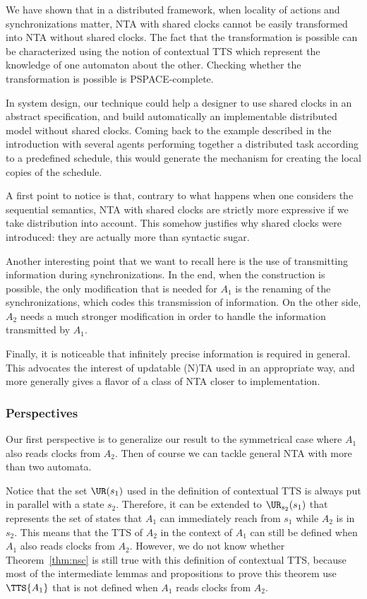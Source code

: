 \documentclass{LMCS}
\theoremstyle{plain}\newtheorem*{prop11}{Proposition~\ref{prop:states} bis}
\begin{document}
We have shown that in a distributed framework, when locality of actions and
synchronizations matter, NTA with shared clocks cannot be easily transformed
into NTA without shared clocks. The fact that the transformation is possible can
be characterized using the notion of contextual TTS which represent the
knowledge of one automaton about the other. Checking whether the transformation
is possible is \textsf{PSPACE}-complete.

In system design, our technique could help a designer to use shared clocks in an
abstract specification, and build automatically an implementable distributed
model without shared clocks.
Coming back to the example described in the introduction with several agents
performing together a distributed task according to a predefined schedule, this
would generate the mechanism for creating the local copies of the schedule.

A first point to notice is that, contrary to what happens when one considers the
sequential semantics, NTA with shared clocks are strictly more expressive if we
take distribution into account. This somehow justifies why shared clocks were
introduced: they are actually more than syntactic sugar.

Another interesting point that we want to recall here is the use of
transmitting information during synchronizations. In the end, when the
construction is possible, the only modification that is needed for $A_1$
is the renaming of the synchronizations, which codes this transmission of
information. On the other side, $A_2$ needs a much stronger modification in
order to handle the information transmitted by $A_1$.

Finally, it is noticeable that infinitely precise information is required in
general. This advocates the interest of updatable (N)TA used in an appropriate
way, and more generally gives a flavor of a class of NTA closer to
implementation.

\subsubsection*{Perspectives}
Our first perspective is to generalize our result to the symmetrical case where
$A_1$ also reads clocks from $A_2$. Then of course we can tackle general NTA
with more than two automata.

Notice that the set $\UR(s_1)$ used in the definition of contextual TTS is
always put in parallel with a state $s_2$. Therefore, it can be extended to
$\UR_{s_2}(s_1)$ that represents the set of states that $A_1$ can immediately
reach from $s_1$ while $A_2$ is in $s_2$. This means that the TTS of
$A_2$ in the context of $A_1$ can still be defined when
$A_1$ also reads clocks from $A_2$.
However, we do not know whether Theorem~\ref{thm:nsc} is still true with this
definition of contextual TTS, because most of the intermediate lemmas and
propositions to prove this theorem use $\TTS{A_1}$ that is not defined
when $A_1$ reads clocks from $A_2$.
\end{document}
